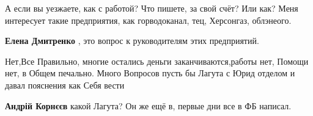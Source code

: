 \begin{itemize}

А если вы уезжаете, как с работой? Что пишете, за свой счёт? Или как? Меня
интересует такие предприятия, как горводоканал, тец, Херсонгаз, облэнеого.

\textbf{Елена Дмитренко} , это вопрос к руководителям этих предприятий.


Нет,Все Правильно, многие остались деньги заканчиваются,работы нет, Помощи нет,
в Общем печально. Много Вопросов пусть бы Лагута с Юрид отделом и давал
пояснения как Себя вести

\textbf{Андрій Корнєєв} какой Лагута? Он же ещё в, первые дни все в ФБ написал.


\end{itemize} %
